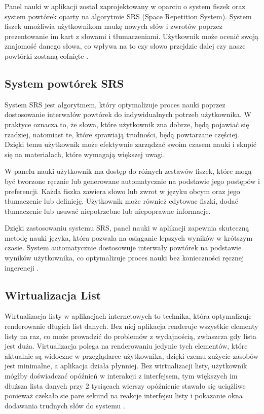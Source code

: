 Panel nauki w aplikacji został zaprojektowany w oparciu o system fiszek oraz system powtórek oparty na algorytmie SRS (Space Repetition System). System fiszek umożliwia użytkownikom naukę nowych słów i zwrotów poprzez prezentowanie im kart z słowami i tłumaczeniami. Użytkownik może ocenić swoją znajomość danego słowa, co wpływa na to czy słowo przejdzie dalej czy nasze powtórki zostaną cofnięte \cite{mallett2012benefits}.

\subsection*{System powtórek SRS}

System SRS jest algorytmem, który optymalizuje proces nauki poprzez dostosowanie interwałów powtórek do indywidualnych potrzeb użytkownika. W praktyce oznacza to, że słowa, które użytkownik zna dobrze, będą pojawiać się rzadziej, natomiast te, które sprawiają trudności, będą powtarzane częściej. Dzięki temu użytkownik może efektywnie zarządzać swoim czasem nauki i skupić się na materiałach, które wymagają większej uwagi.

W panelu nauki użytkownik ma dostęp do różnych zestawów fiszek, które mogą być tworzone ręcznie lub generowane automatycznie na podstawie jego postępów i preferencji. Każda fiszka zawiera słowo lub zwrot w języku obcym oraz jego tłumaczenie lub definicję. Użytkownik może również edytowac fiszki, dodać tłumaczenie lub usuwać niepotrzebne lub niepoprawne informacje.

Dzięki zastosowaniu systemu SRS, panel nauki w aplikacji zapewnia skuteczną metodę nauki języka, która pozwala na osiąganie lepszych wyników w krótszym czasie. System automatycznie dostosowuje interwały powtórek na podstawie wyników użytkownika, co optymalizuje proces nauki bez konieczności ręcznej ingerencji \cite{mallett2012benefits}.

\subsection{Wirtualizacja List}
Wirtualizacja listy w aplikacjach internetowych to technika, która optymalizuje renderowanie długich list danych. Bez niej aplikacja renderuje wszystkie elementy listy na raz, co może prowadzić do problemów z wydajnością, zwłaszcza gdy lista jest duża. Virtualizacja polega na renderowaniu jedynie tych elementów, które aktualnie są widoczne w przeglądarce użytkownika, dzięki czemu zużycie zasobów jest minimalne, a aplikacja działa płynniej. Bez wirtualizacji listy, użytkownik mógłby doświadczać opóźnień w interakcji z interfejsem, tym większych im dłuższa lista danych przy 2 tysiącach wierszy opóźnienie stawało się uciążliwe ponieważ czekało sie pare sekund na reakcje interfejsu listy i pokazanie okna dodawania trudnych słów do systemu \cite{weng2004approach}.

